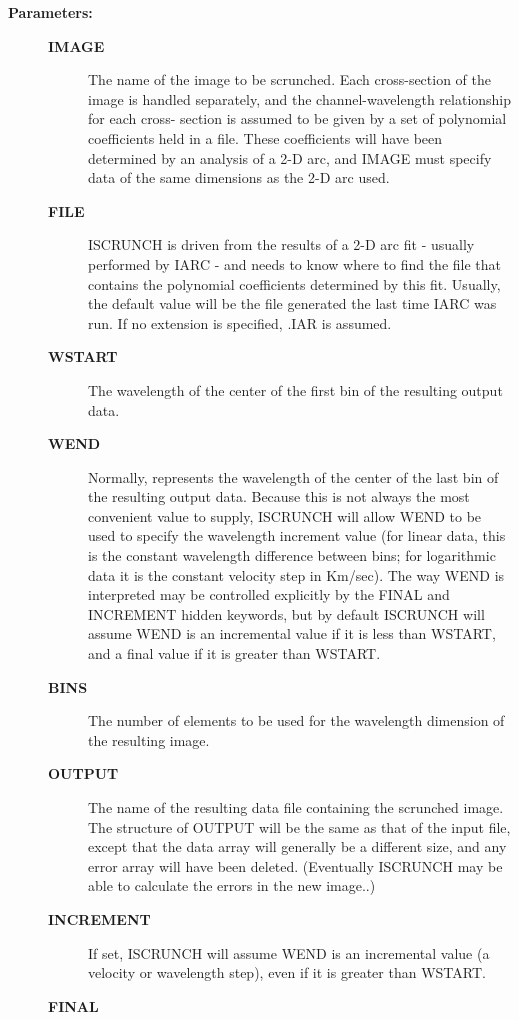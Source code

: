 \begin{description}
\begin{description}
\item [\textbf{Parameters:}]
\begin{description}
\item [\textbf{IMAGE}]
 The name of the image to be scrunched.  Each
 cross-section of the image is handled separately, and
 the channel-wavelength relationship for each cross-
 section is assumed to be given by a set of polynomial
 coefficients held in a file.  These coefficients will
 have been determined by an analysis of a 2-D arc, and
 IMAGE must specify data of the same dimensions as the
 2-D arc used.
\item [\textbf{FILE}]
 ISCRUNCH is driven from the results of a 2-D arc fit -
 usually performed by IARC - and needs to know where to
 find the file that contains the polynomial coefficients
 determined by this fit.  Usually, the default value will
 be the file generated the last time IARC was run.  If no
 extension is specified, .IAR is assumed.
\item [\textbf{WSTART}]
 The wavelength of the center of the first bin
 of the resulting output data.
\item [\textbf{WEND}]
 Normally, represents the wavelength of the center of
 the last bin of the resulting output data.  Because this
 is not always the most convenient value to supply, ISCRUNCH
 will allow WEND to be used to specify the wavelength
 increment value (for linear data, this is the constant
 wavelength difference between bins; for logarithmic data
 it is the constant velocity step in Km/sec).  The way
 WEND is interpreted may be controlled explicitly by the
 FINAL and INCREMENT hidden keywords, but by default ISCRUNCH
 will assume WEND is an incremental value if it is less than
 WSTART, and a final value if it is greater than WSTART.
\item [\textbf{BINS}]
 The number of elements to be used for the
 wavelength dimension of the resulting image.
\item [\textbf{OUTPUT}]
 The name of the resulting data file containing
 the scrunched image. The structure of OUTPUT will be the
 same as that of the input file, except that the data array
 will generally be a different size, and any error array
 will have been deleted.  (Eventually ISCRUNCH may be able
 to calculate the errors in the new image..)
\item [\textbf{INCREMENT}]
 If set, ISCRUNCH will assume WEND is an incremental value
 (a velocity or wavelength step), even if it is greater than
 WSTART.
\item [\textbf{FINAL}]

\end{description}
\end{description}
\end{description}
